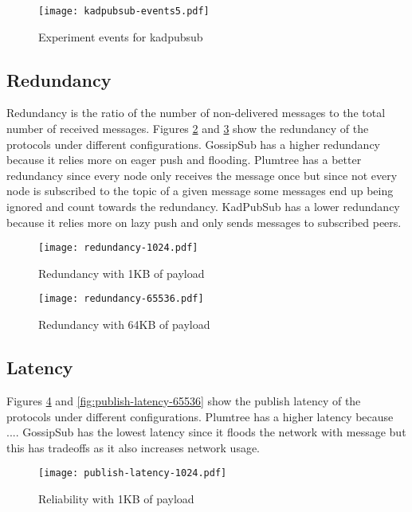 \documentclass[sigconf]{acmart}
\begin{document}
\begin{figure}[htp]
    \centering
    \texttt{[image: kadpubsub-events5.pdf]}
    \caption{Experiment events for kadpubsub}
    \label{fig:kadpubsub-events5}
\end{figure}


\subsection{Redundancy}
Redundancy is the ratio of the number of non-delivered messages to the total number of received messages.
Figures \ref{fig:redundancy-1024} and \ref{fig:redundancy-65536} show the redundancy of the protocols under different configurations. GossipSub has a higher redundancy because it relies more on eager push and flooding. Plumtree has a better redundancy since every node only receives the message once but since not every node is subscribed to the topic of a given message some messages end up being ignored and count towards the redundancy. KadPubSub has a lower redundancy because it relies more on lazy push and only sends messages to subscribed peers.

\begin{figure}[htp]
    \centering
    \texttt{[image: redundancy-1024.pdf]}
    \caption{Redundancy with 1KB of payload}
    \label{fig:redundancy-1024}
\end{figure}

\begin{figure}[htp]
    \centering
    \texttt{[image: redundancy-65536.pdf]}
    \caption{Redundancy with 64KB of payload}
    \label{fig:redundancy-65536}
\end{figure}

\subsection{Latency}
Figures \ref{fig:publish-latency-1024} and \ref{fig:publish-latency-65536} show the publish latency of the protocols under different configurations. Plumtree has a higher latency because .... GossipSub has the lowest latency since it floods the network with message but this has tradeoffs as it also increases network usage.

\begin{figure}[htp]
    \centering
    \texttt{[image: publish-latency-1024.pdf]}
    \caption{Reliability with 1KB of payload}
    \label{fig:publish-latency-1024}
\end{figure}
\end{document}

